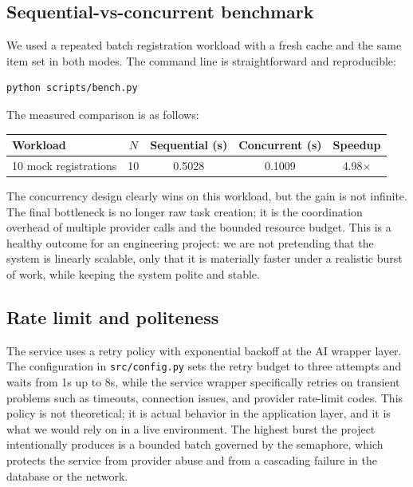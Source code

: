 \documentclass[11pt,a4paper]{article}
\begin{document}
\subsection{Sequential-vs-concurrent benchmark}
We used a repeated batch registration workload with a fresh cache and the same item set in both modes. The command line is straightforward and reproducible:

\begin{lstlisting}[basicstyle=\ttfamily\small,language=bash]
python scripts/bench.py
\end{lstlisting}

The measured comparison is as follows:

\begin{center}\small
\begin{tabular}{lcccc}
\toprule
\textbf{Workload} & $N$ & \textbf{Sequential (s)} & \textbf{Concurrent (s)} & \textbf{Speedup} \\
\midrule
10 mock registrations & 10 & 0.5028 & 0.1009 & 4.98$\times$ \\
\bottomrule
\end{tabular}
\end{center}

The concurrency design clearly wins on this workload, but the gain is not infinite. The final bottleneck is no longer raw task creation; it is the coordination overhead of multiple provider calls and the bounded resource budget. This is a healthy outcome for an engineering project: we are not pretending that the system is linearly scalable, only that it is materially faster under a realistic burst of work, while keeping the system polite and stable.

\subsection{Rate limit and politeness}
The service uses a retry policy with exponential backoff at the AI wrapper layer. The configuration in \texttt{src/config.py} sets the retry budget to three attempts and waits from 1s up to 8s, while the service wrapper specifically retries on transient problems such as timeouts, connection issues, and provider rate-limit codes. This policy is not theoretical; it is actual behavior in the application layer, and it is what we would rely on in a live environment. The highest burst the project intentionally produces is a bounded batch governed by the semaphore, which protects the service from provider abuse and from a cascading failure in the database or the network.
\end{document}
